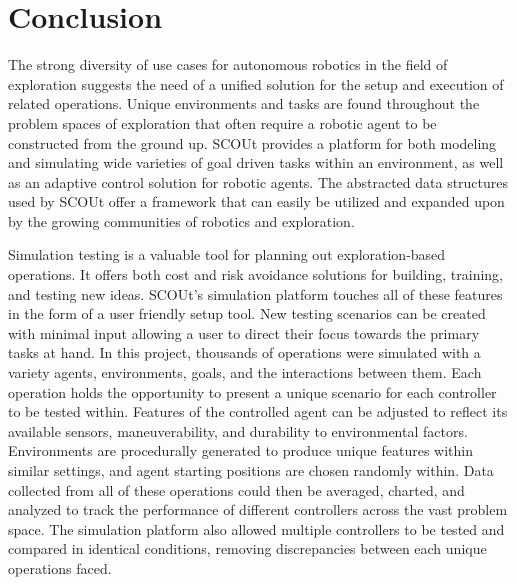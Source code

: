 

\chapter{Conclusion} \label{ch:conclusion}

The strong diversity of use cases for autonomous robotics in the field of exploration suggests the need of a unified solution for the setup and execution of related operations.
Unique environments and tasks are found throughout the problem spaces of exploration that often require a robotic agent to be constructed from the ground up.
SCOUt provides a platform for both modeling and simulating wide varieties of goal driven tasks within an environment, as well as an adaptive control solution for robotic agents.
The abstracted data structures used by SCOUt offer a framework that can easily be utilized and expanded upon by the growing communities of robotics and exploration.

Simulation testing is a valuable tool for planning out exploration-based operations.
It offers both cost and risk avoidance solutions for building, training, and testing new ideas.
SCOUt's simulation platform touches all of these features in the form of a user friendly setup tool.
New testing scenarios can be created with minimal input allowing a user to direct their focus towards the primary tasks at hand.
In this project, thousands of operations were simulated with a variety agents, environments, goals, and the interactions between them.
Each operation holds the opportunity to present a unique scenario for each controller to be tested within.
Features of the controlled agent can be adjusted to reflect its available sensors, maneuverability, and durability to environmental factors.
Environments are procedurally generated to produce unique features within similar settings, and agent starting positions are chosen randomly within.
Data collected from all of these operations could then be averaged, charted, and analyzed to track the performance of different controllers across the vast problem space.
The simulation platform also allowed multiple controllers to be tested and compared in identical conditions, removing discrepancies between each unique operations faced.

